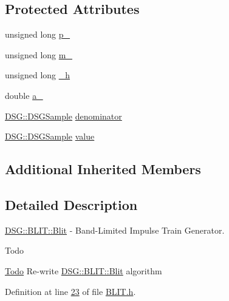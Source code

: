 \subsection*{Protected Attributes}
\begin{DoxyCompactItemize}
\item 
unsigned long \hyperlink{class_d_s_g_1_1_b_l_i_t_1_1_blit_a04d7d6b22a386428e5c25668e1587794}{p\+\_\+}
\item 
unsigned long \hyperlink{class_d_s_g_1_1_b_l_i_t_1_1_blit_afa6e4d46efdbfa032762610601ed42a0}{m\+\_\+}
\item 
unsigned long \hyperlink{class_d_s_g_1_1_b_l_i_t_1_1_blit_a632c6f070187969b90c70b65668b82bc}{\+\_\+h}
\item 
double \hyperlink{class_d_s_g_1_1_b_l_i_t_1_1_blit_a66e2a97840ad0772daaaa9aea63b77b4}{a\+\_\+}
\item 
\hyperlink{namespace_d_s_g_ac39a94cd27ebcd9c1e7502d0c624894a}{D\+S\+G\+::\+D\+S\+G\+Sample} \hyperlink{class_d_s_g_1_1_b_l_i_t_1_1_blit_a6de89a5a240f226c940aef97661c9cee}{denominator}
\item 
\hyperlink{namespace_d_s_g_ac39a94cd27ebcd9c1e7502d0c624894a}{D\+S\+G\+::\+D\+S\+G\+Sample} \hyperlink{class_d_s_g_1_1_b_l_i_t_1_1_blit_ac8fb9d4fb45d0697bf364bb5d6b570ce}{value}
\end{DoxyCompactItemize}
\subsection*{Additional Inherited Members}


\subsection{Detailed Description}
\hyperlink{class_d_s_g_1_1_b_l_i_t_1_1_blit}{D\+S\+G\+::\+B\+L\+I\+T\+::\+Blit} -\/ Band-\/\+Limited Impulse Train Generator. 

\begin{DoxyRefDesc}{Todo}
\item[\hyperlink{todo__todo000001}{Todo}]Re-\/write \hyperlink{class_d_s_g_1_1_b_l_i_t_1_1_blit}{D\+S\+G\+::\+B\+L\+I\+T\+::\+Blit} algorithm \end{DoxyRefDesc}


Definition at line \hyperlink{_b_l_i_t_8h_source_l00023}{23} of file \hyperlink{_b_l_i_t_8h_source}{B\+L\+I\+T.\+h}.



